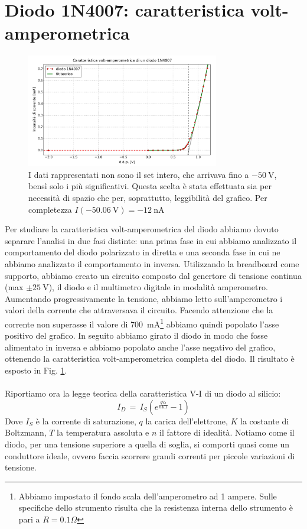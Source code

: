 \section{Diodo 1N4007: caratteristica volt-amperometrica}

\begin{figure}
	\label{fig:diodo}
	\includegraphics[width=0.75\textwidth]{diodo.pdf}
	\caption{I dati rappresentati non sono il set intero, che arrivava fino a $\SI{-50}{\volt}$, bensì solo i più significativi. Questa scelta è stata effettuata sia per necessità di spazio che per, soprattutto, leggibilità del grafico. Per completezza $I(\SI{-50.06}{\volt}) = \SI{-12}{\nano\ampere}$}
	\label{fig:diodo}
\end{figure}

Per studiare la caratteristica volt-amperometrica del diodo abbiamo dovuto separare l'analisi in due fasi distinte: una prima fase in cui abbiamo analizzato il comportamento del diodo polarizzato in diretta e una seconda fase in cui ne abbiamo analizzato il comportamento in inversa.
Utilizzando la breadboard come supporto, abbiamo creato un circuito composto dal genertore di tensione continua (max $\pm \SI{25}{\volt}$), il diodo e il multimetro digitale in modalità amperometro. Aumentando progressivamente la tensione, abbiamo letto sull'amperometro i valori della corrente che attraversava il circuito.
Facendo attenzione che la corrente non superasse il valore di \SI{700}{\milli\ampere}\footnote{Abbiamo impostato il fondo scala dell'amperometro ad 1 ampere. Sulle specifiche dello strumento risulta che la resistenza interna dello strumento è pari a $R=0.1 \Omega$} abbiamo quindi popolato l'asse positivo del grafico. In seguito abbiamo girato il diodo in modo che fosse alimentato in inversa e abbiamo popolato anche l'asse negativo del grafico, ottenendo la caratteristica volt-amperometrica completa del diodo. Il risultato è esposto in Fig. \ref{fig:diodo}. 
\\
\\
Riportiamo ora la legge teorica della caratteristica V-I di un diodo al silicio:
\begin{equation}
I_{D} \, = \, I_{S} \left( e^{\frac{q V_d}{nKT}} -1 \right)
\label{eq:diode}
\end{equation}
Dove $I_S$ è la corrente di saturazione, $q$ la carica dell'elettrone, $K$ la costante di Boltzmann, $T$ la temperatura assoluta e $n$ il fattore di idealità. 
Notiamo come il diodo, per una tensione superiore a quella di soglia, si comporti quasi come un conduttore ideale, ovvero faccia scorrere grandi correnti per piccole variazioni di tensione. 

